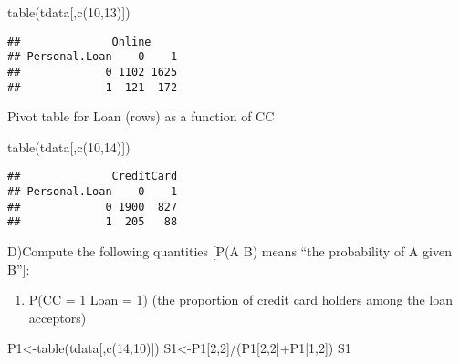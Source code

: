 \documentclass[
]{article}
\newenvironment{Shaded}{\begin{snugshade}}{\end{snugshade}}
\newcommand{\DecValTok}[1]{\textcolor[rgb]{0.00,0.00,0.81}{#1}}
\newcommand{\FunctionTok}[1]{\textcolor[rgb]{0.00,0.00,0.00}{#1}}
\newcommand{\NormalTok}[1]{#1}
\newcommand{\OtherTok}[1]{\textcolor[rgb]{0.56,0.35,0.01}{#1}}
\newcommand{\SpecialCharTok}[1]{\textcolor[rgb]{0.00,0.00,0.00}{#1}}
\providecommand{\tightlist}{%
  \setlength{\itemsep}{0pt}\setlength{\parskip}{0pt}}
\begin{document}
\begin{Shaded}
\begin{Highlighting}[]
\FunctionTok{table}\NormalTok{(tdata[,}\FunctionTok{c}\NormalTok{(}\DecValTok{10}\NormalTok{,}\DecValTok{13}\NormalTok{)])}
\end{Highlighting}
\end{Shaded}

\begin{verbatim}
##              Online
## Personal.Loan    0    1
##             0 1102 1625
##             1  121  172
\end{verbatim}

Pivot table for Loan (rows) as a function of CC

\begin{Shaded}
\begin{Highlighting}[]
\FunctionTok{table}\NormalTok{(tdata[,}\FunctionTok{c}\NormalTok{(}\DecValTok{10}\NormalTok{,}\DecValTok{14}\NormalTok{)])}
\end{Highlighting}
\end{Shaded}

\begin{verbatim}
##              CreditCard
## Personal.Loan    0    1
##             0 1900  827
##             1  205   88
\end{verbatim}

D)Compute the following quantities {[}P(A \textbar{} B) means ``the
probability of A given B''{]}:

\begin{enumerate}
\def\labelenumi{\roman{enumi}.}
\tightlist
\item
  P(CC = 1 \textbar{} Loan = 1) (the proportion of credit card holders
  among the loan acceptors)
\end{enumerate}

\begin{Shaded}
\begin{Highlighting}[]
\NormalTok{P1}\OtherTok{\textless{}{-}}\FunctionTok{table}\NormalTok{(tdata[,}\FunctionTok{c}\NormalTok{(}\DecValTok{14}\NormalTok{,}\DecValTok{10}\NormalTok{)])}
\NormalTok{S1}\OtherTok{\textless{}{-}}\NormalTok{P1[}\DecValTok{2}\NormalTok{,}\DecValTok{2}\NormalTok{]}\SpecialCharTok{/}\NormalTok{(P1[}\DecValTok{2}\NormalTok{,}\DecValTok{2}\NormalTok{]}\SpecialCharTok{+}\NormalTok{P1[}\DecValTok{1}\NormalTok{,}\DecValTok{2}\NormalTok{])}
\NormalTok{S1}
\end{Highlighting}
\end{Shaded}
\end{document}

